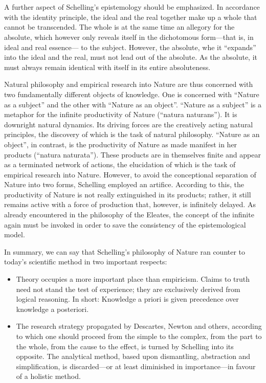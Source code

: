 \documentclass[9pt,a4paper,twocolumn]{article}
\begin{document}
            \\
            \\
            A further aspect of Schelling's epistemology should be emphasized. In accordance with the identity principle, the ideal and the real together make up a whole that cannot be transcended. The whole is at the same time an allegory for the absolute, which however only reveals itself in the dichotomous form—that is, in ideal and real essence— to the subject. However, the absolute, whe it “expands” into the ideal and the real, must not lead out of the absolute. As the absolute, it must always remain identical with itself in its entire absoluteness.
            \begin{qt}
                Natural philosophy and empirical research into Nature are thus concerned with two fundamentally different objects of knowledge. One is concerned with “Nature as a subject” and the other with “Nature as an object”. “Nature as a subject” is a metaphor for the infinite productivity of Nature (“natura naturans”). It is downright natural dynamics. Its driving forces are the creatively acting natural principles, the discovery of which is the task of natural philosophy. “Nature as an object”, in contrast, is the productivity of Nature as made manifest in her products (“natura naturata”). These products are in themselves finite and appear as a terminated network of actions, the elucidation of which is the task of empirical research into Nature. However, to avoid the conceptional separation of Nature into two forms, Schelling employed an artifice. According to this, the productivity of Nature is not really extinguished in its products; rather, it still remains active with a force of production that, however, is infinitely delayed. As already encountered in the philosophy of the Eleates, the concept of the infinite again must be invoked in order to save the consistency of the epistemological model.
            \end{qt}
            In summary, we can say that Schelling's philosophy of Nature ran counter to today's scientific method in two important respects: \begin{itemize}
                \item Theory occupies a more important place than empiricism. Claims to truth need not stand the test of experience; they are exclusively derived from logical reasoning. In short: Knowledge a priori is given precedence over knowledge a posteriori.
                \item The research strategy propagated by Descartes, Newton and others, according to which one should proceed from the simple to the complex, from the part to the whole, from the cause to the effect, is turned by Schelling into its opposite. The analytical method, based upon dismantling, abstraction and simplification, is discarded—or at least diminished in importance—in favour of a holistic method.
            \end{itemize}
\end{document}
